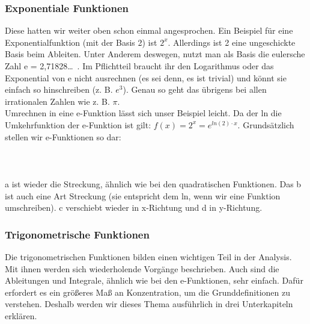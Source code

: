 	\subsubsection{Exponentiale Funktionen}
		Diese hatten wir weiter oben schon einmal angesprochen. Ein Beispiel für eine
		Exponentialfunktion (mit der Basis 2) ist \(2^x\). Allerdings ist 2 eine
		ungeschickte Basis beim Ableiten. Unter Anderem deswegen, nutzt man als Basis
		die eulersche Zahl e = 2,71828\ldots \ . Im Pflichtteil braucht ihr den
		Logarithmus oder das Exponential von e nicht ausrechnen (es sei denn, es ist
		trivial) und könnt sie einfach so hinschreiben (z. B. \(e^3\)). Genau so geht
		das übrigens bei allen irrationalen Zahlen wie z. B. \(\pi\).\\
		Umrechnen in eine e-Funktion lässt sich unser Beispiel leicht. Da der ln die
		Umkehrfunktion der e-Funktion ist gilt: \(f(x) = 2^x = e^{ln(2) \cdot x}\).
		Grundsätzlich stellen wir e-Funktionen so dar:
		\\ \\
		\formel{\[f(x)=a \cdot e^{b(x-c)} + d\]}
		\\ \\
		a ist wieder die Streckung, ähnlich wie bei den quadratischen Funktionen. Das
		b ist auch eine Art Streckung (sie entspricht dem ln, wenn wir eine Funktion
		umschreiben). c verschiebt wieder in x-Richtung und d in y-Richtung.\\

	\subsubsection{Trigonometrische Funktionen}
		Die trigonometrischen Funktionen bilden einen wichtigen Teil in der Analysis.
		Mit ihnen werden sich wiederholende Vorgänge beschrieben. Auch sind die
		Ableitungen und Integrale, ähnlich wie bei den e-Funktionen, sehr einfach.
		Dafür erfordert es ein größeres Maß an Konzentration, um die Grunddefinitionen
		zu verstehen. Deshalb werden wir dieses Thema ausführlich in drei
		Unterkapiteln erklären.
		
